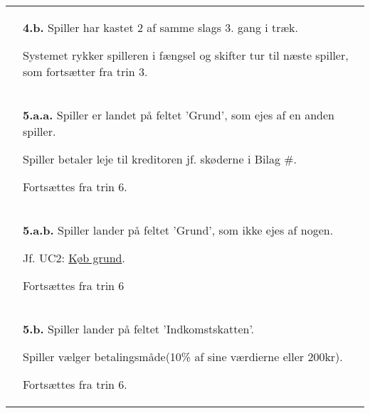\documentclass[class=article, crop=false]{standalone}
\begin{document}
\begin{table}[H]
\begin{tabularx}{\textwidth}{|l|X|}
                            & \textbf{4.b.} Spiller har kastet 2 af samme slags 3. gang i træk.
                            \begin{enumerate} \begin{tabenum}

                                                  \item Systemet rykker spilleren i fængsel og skifter tur til næste spiller, som fortsætter fra trin 3.
                            \end{tabenum} \end{enumerate}
                            \\




                              & \textbf{5.a.a.} Spiller er landet på feltet
                                'Grund', som ejes af en anden spiller.
                                \begin{enumerate} \begin{tabenum}
                                  \item Spiller betaler leje til kreditoren
                                        jf. skøderne i Bilag \#.
                                  \item Fortsættes fra trin 6.
                                \end{tabenum} \end{enumerate}
                                \\
                            & \textbf{5.a.b.} Spiller lander på feltet
                                'Grund', som ikke ejes af nogen.
                            \begin{enumerate} \begin{tabenum}
                                  \item Jf. UC2: \underline{Køb grund}.
                                  \item Fortsættes fra trin 6
                            \end{tabenum} \end{enumerate}
                            \\


                            & \textbf{5.b.} Spiller lander på feltet
                            'Indkomstskatten'.
                            \begin{enumerate} \begin{tabenum}
                              \item Spiller vælger betalingsmåde(10\% af sine værdierne eller 200kr).
                              \item Fortsættes fra trin 6.
                            \end{tabenum} \end{enumerate}
                            \\



\end{tabularx}
\end{table}
\end{document}
